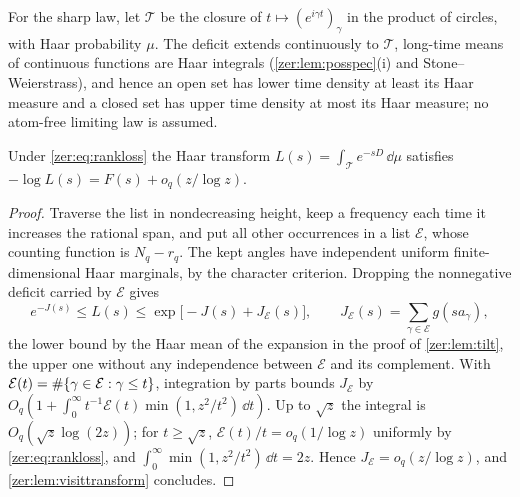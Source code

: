 For the sharp law, let $\mathcal T$ be the closure of $t\mapsto(e^{i\gamma t})_\gamma$ in the product
of circles, with Haar probability $\mu$. The deficit extends continuously to $\mathcal T$, long-time
means of continuous functions are Haar integrals (\cref{zer:lem:posspec}(i) and Stone--Weierstrass),
and hence an open set has lower time density at least its Haar measure and a closed set has upper
time density at most its Haar measure; no atom-free limiting law is assumed.

\begin{lemma}\label{zer:lem:visitsparse}
Under \eqref{zer:eq:rankloss} the Haar transform $L(s)=\int_{\mathcal T}e^{-sD}\,\dd\mu$ satisfies
$-\log L(s)=F(s)+o_q(z/\log z)$.
\end{lemma}
\begin{proof}
Traverse the list in nondecreasing height, keep a frequency each time it increases the rational
span, and put all other occurrences in a list $\mathcal E$, whose counting function is $N_q-r_q$. The
kept angles have independent uniform finite-dimensional Haar marginals, by the character criterion.
Dropping the nonnegative deficit carried by $\mathcal E$ gives
\[
 e^{-J(s)}\le L(s)\le\exp\bigl[-J(s)+J_{\mathcal E}(s)\bigr],\qquad
 J_{\mathcal E}(s)=\sum_{\gamma\in\mathcal E}g(sa_\gamma),
\]
the lower bound by the Haar mean of the expansion in the proof of \cref{zer:lem:tilt}, the upper
one without any independence between $\mathcal E$ and its complement. With
$\mathcal E(t)=\#\{\gamma\in\mathcal E:\gamma\le t\}$, integration by parts bounds $J_{\mathcal E}$
by $O_q(1+\int_0^\infty t^{-1}\mathcal E(t)\min(1,z^2/t^2)\,\dd t)$. Up to $\sqrt z$ the integral is
$O_q(\sqrt z\log(2z))$; for $t\ge\sqrt z$, $\mathcal E(t)/t=o_q(1/\log z)$ uniformly by
\eqref{zer:eq:rankloss}, and $\int_0^\infty\min(1,z^2/t^2)\,\dd t=2z$. Hence $J_{\mathcal E}=o_q(z/\log z)$,
and \cref{zer:lem:visittransform} concludes.
\end{proof}

